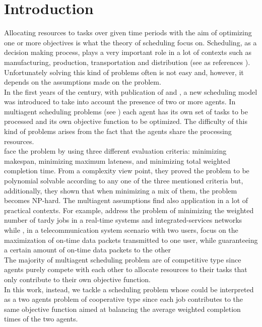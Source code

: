 \documentclass[opre,nonblindrev]{informs3} %
\begin{document}
\section{Introduction}
Allocating resources to tasks over given time periods with the aim of optimizing one or more objectives is what the theory of scheduling focus on. Scheduling, as a decision making process, plays a very important role in a lot of contexts such as manufacturing, production, transportation and distribution (see as references \cite{pinedo09,pinedo16}). Unfortunately solving this kind of problems often is not easy and, however, it depends on the assumptions made on the problem.\\
In the first years of the century, with publication of \cite{agnetis04} and \cite{baker2003}, a new scheduling model was introduced to take into account the presence of two or more agents. In multiagent scheduling problems (see \cite{agnetis-book14}) each agent has its own set of tasks to be processed and its own objective function to be optimized. The difficulty of this kind of problems arises from the fact that the agents share the processing resources.\\
\cite{baker2003} face the problem by using three different evaluation criteria: minimizing makespan, minimizing maximum lateness, and minimizing total weighted completion time. From a complexity view point, they proved the problem to be polynomial solvable according to any one of the three mentioned criteria but, additionally, they shown that when minimizing a mix of them, the problem becomes NP-hard. 
The multiagent assumptions find also application in a lot of practical contexts. For example, \cite{Peha95} address the problem of minimizing the weighted number of tardy jobs in a real-time systems and integrated-services networks while \cite{Arbib04}, in a  telecommunication system scenario with two users, focus on the maximization of on‐time data packets transmitted to one user, while guaranteeing a certain amount of on‐time data packets to the other\\
 The majority of multiagent scheduling problem are of competitive type since agents purely compete with each other to allocate resources to their tasks that only contribute to their own objective function.\\ In this work, instead, we tackle a scheduling problem whose could be interpreted as a two agents problem of cooperative type since each job contributes to the same objective function aimed at balancing the average weighted completion times of the two agents.\\
\end{document}
